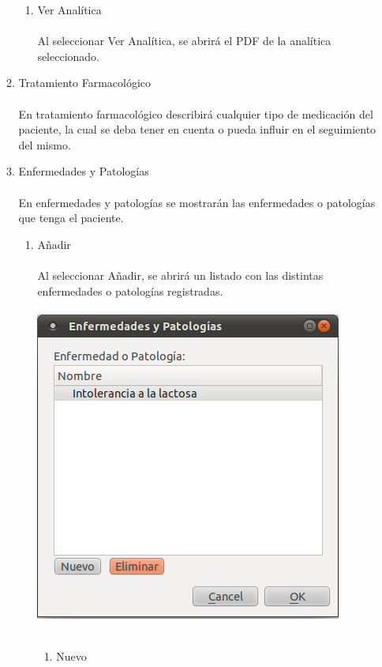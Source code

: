 \documentclass[12pt, spanish]{article}
\begin{document}
\begin{enumerate}
\begin{enumerate}
\begin{enumerate}
\item Ver Analítica\\\\
Al seleccionar Ver Analítica, se abrirá el PDF de la analítica seleccionado.\\
\end{enumerate}
\item Tratamiento Farmacológico\\\\
En tratamiento farmacológico describirá cualquier tipo de medicación del paciente, la cual se deba tener en cuenta o pueda influir en el seguimiento del mismo.\\
\item Enfermedades y Patologías\\\\
En enfermedades y patologías se mostrarán las enfermedades o patologías que tenga el paciente.\\
\begin{enumerate}
\item Añadir\\\\
Al seleccionar Añadir, se abrirá un listado con las distintas enfermedades o patologías registradas.\\\\
\includegraphics[scale=0.5]{Image/enfermedad.png}\\\\
\begin{enumerate}
\item Nuevo\\\\

\end{enumerate}
\end{enumerate}
\end{enumerate}
\end{enumerate}
\end{document}
